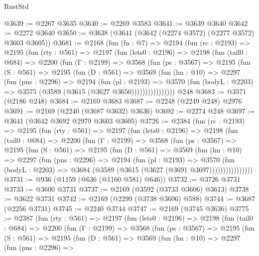\begin{lexlean}{RustStd}
\begin{coremodule}
{\begin{coremodule}
{{{{{{{{{{{{{{{@3639 := @2267 @3635
@3640 := @2269 @3583
@3641 := @3639 @3640
@3642 := @2272 @3640
@3650 := @3638 (@3641 (@3642 (@2274 @3572) (@2277 @3572) @3603 @3605))
@3681 := @2168
    (fun (fn : @7) =>
    @2194
      (fun (rc : @2193) =>
      @2195
        (fun (rty : @561) =>
        @2197
          (fun (lets0 : @2196) =>
          @2198
            (fun (tail0 : @684) =>
            @2200
              (fun (Γ : @2199) =>
              @3568
                (fun (ps : @3567) =>
                @2195
                  (fun (S : @561) =>
                  @2195
                    (fun (D : @561) =>
                    @3569
                      (fun (hn : @10) =>
                      @2297
                        (fun (pns : @2296) =>
                        @2194
                          (fun (pl : @2193) =>
                          @3570
                            (fun (bodyL : @2203) => @3575 (@3589 (@3615 (@3627 @3650))))))))))))))))
    @248
@3683 := @3571 (@2186 @248)
@3684 := @2169 @3683
@3687 := @2248 (@2249 @248) @2976
@3691 := @2169 (@2240 (@3687 @3632) @3636)
@3692 := @2274 @248
@3697 := @3641 (@3642 @3692 @2979 @3603 @3605)
@3726 := @2384
    (fun (rc : @2193) =>
    @2195
      (fun (rty : @561) =>
      @2197
        (fun (lets0 : @2196) =>
        @2198
          (fun (tail0 : @684) =>
          @2200
            (fun (Γ : @2199) =>
            @3568
              (fun (ps : @3567) =>
              @2195
                (fun (S : @561) =>
                @2195
                  (fun (D : @561) =>
                  @3569
                    (fun (hn : @10) =>
                    @2297
                      (fun (pns : @2296) =>
                      @2194
                        (fun (pl : @2193) =>
                        @3570
                          (fun (bodyL : @2203) =>
                          @3684 (@3589 (@3615 (@3627 (@3691 @3697))))))))))))))))
@3731 := @936 (@1159 (@636 (@1160 @581) @646))
@3732 := @3726 @3731
@3733 := @3600 @3731
@3737 := @2169 (@3592 (@3733 @3606) @3613)
@3738 := @3622 @3731
@3742 := @2169 (@2299 (@3738 @3606) @588)
@3744 := @3687 (@2256 @3731)
@3745 := @2240 @3744
@3747 := @2169 (@3745 @3636)
@3775 := @2387
    (fun (rty : @561) =>
    @2197
      (fun (lets0 : @2196) =>
      @2198
        (fun (tail0 : @684) =>
        @2200
          (fun (Γ : @2199) =>
          @3568
            (fun (ps : @3567) =>
            @2195
              (fun (S : @561) =>
              @2195
                (fun (D : @561) =>
                @3569
                  (fun (hn : @10) =>
                  @2297
                    (fun (pns : @2296) =>
}}}}}}}}}}}}}}}
\end{coremodule}}
\end{coremodule}
\end{lexlean}

